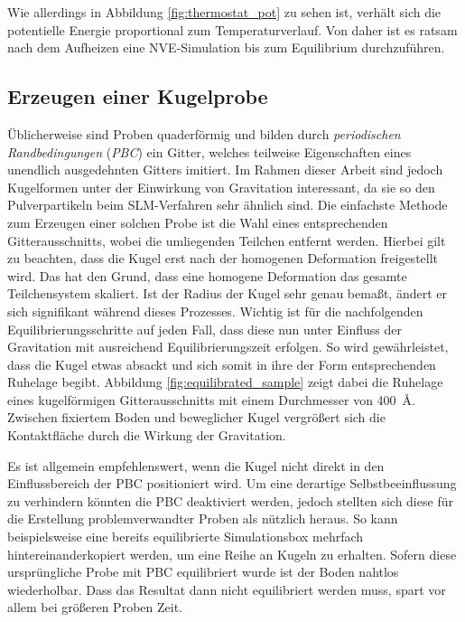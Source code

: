 		Wie allerdings in Abbildung \ref{fig:thermostat_pot} zu sehen ist, verhält sich die
		potentielle Energie proportional zum Temperaturverlauf. Von daher ist es ratsam nach dem
		Aufheizen eine NVE-Simulation bis zum Equilibrium durchzuführen.

	\subsection{Erzeugen einer Kugelprobe}
		Üblicherweise sind Proben quaderförmig und bilden durch \emph{periodischen Randbedingungen}
		(\emph{PBC}) ein Gitter, welches teilweise Eigenschaften eines unendlich ausgedehnten
		Gitters imitiert. Im Rahmen dieser Arbeit sind jedoch Kugelformen unter der Einwirkung von
		Gravitation interessant, da sie so den Pulverpartikeln beim SLM-Verfahren sehr ähnlich
		sind. Die einfachste Methode zum Erzeugen einer solchen Probe ist die Wahl eines
		entsprechenden Gitterausschnitts, wobei die umliegenden Teilchen entfernt werden.
		Hierbei gilt zu beachten, dass die Kugel erst nach der homogenen Deformation freigestellt
		wird. Das hat den Grund, dass eine homogene Deformation das gesamte Teilchensystem
		skaliert. Ist der Radius der Kugel sehr genau bemaßt, ändert er sich signifikant während
		dieses Prozesses. Wichtig ist für die nachfolgenden Equilibrierungsschritte auf jeden
		Fall, dass diese nun unter Einfluss der Gravitation mit ausreichend Equilibrierungszeit
		erfolgen. So wird gewährleistet, dass die Kugel etwas absackt und sich somit in ihre der
		Form entsprechenden Ruhelage begibt. Abbildung \ref{fig:equilibrated_sample} zeigt dabei
		die Ruhelage eines kugelförmigen Gitterausschnitts mit einem Durchmesser von
		\SI{400}{\angstrom}. Zwischen fixiertem Boden und beweglicher Kugel vergrößert sich die
		Kontaktfläche durch die Wirkung der Gravitation.

		Es ist allgemein empfehlenswert, wenn die Kugel nicht direkt in den Einflussbereich der
		PBC positioniert wird. Um eine derartige Selbstbeeinflussung zu verhindern könnten die PBC
		deaktiviert werden, jedoch stellten sich diese für die Erstellung problemverwandter Proben
		als nützlich heraus. So kann beispielsweise eine bereits equilibrierte Simulationsbox
		mehrfach hintereinanderkopiert werden, um eine Reihe an Kugeln zu erhalten. Sofern diese
		ursprüngliche Probe mit PBC equilibriert wurde ist der Boden nahtlos wiederholbar.
		Dass das Resultat dann nicht equilibriert werden muss, spart vor allem bei größeren Proben
		Zeit.

